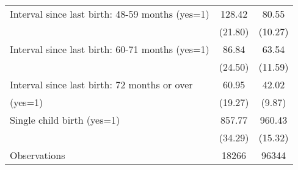 \begin{tabular}{l*{2}{c}}
Interval since last birth: 48-59 months (yes=1)   &      128.42&       80.55\\
                                                  &     (21.80)&     (10.27)\\
Interval since last birth: 60-71 months (yes=1)   &       86.84&       63.54\\
                                                  &     (24.50)&     (11.59)\\
Interval since last birth: 72 months or over      &       60.95&       42.02\\
(yes=1)                                           &     (19.27)&      (9.87)\\
Single child birth (yes=1)                        &      857.77&      960.43\\
                                                  &     (34.29)&     (15.32)\\
\hline
Observations                                      &       18266&       96344\\
\hline\hline
\end{tabular}
